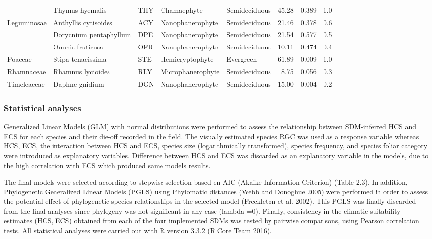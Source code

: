 \documentclass[11pt,twoside]{reedthesis}
\begin{document}
\begin{landscape}
\begin{table}[H]
\begin{tabular}[t]{lllllrrr}
 & Thymus hyemalis & THY & Chamaephyte & Semideciduous & 45.28 & 0.389 & 1.0\\
Leguminosae & Anthyllis cytisoides & ACY & Nanophanerophyte & Semideciduous & 21.46 & 0.378 & 0.6\\
 & Dorycnium pentaphyllum & DPE & Nanophanerophyte & Semideciduous & 21.54 & 0.577 & 0.5\\
 & Ononis fruticosa & OFR & Nanophanerophyte & Semideciduous & 10.11 & 0.474 & 0.4\\
Poaceae & Stipa tenacissima & STE & Hemicryptophyte & Evergreen & 61.89 & 0.009 & 1.0\\
Rhamnaceae & Rhamnus lycioides & RLY & Microphanerophyte & Semideciduous & 8.75 & 0.056 & 0.3\\
Timeleaceae & Daphne gnidium & DGN & Nanophanerophyte & Semideciduous & 15.00 & 0.004 & 0.2\\
\bottomrule
\end{tabular}
\end{table}
\end{landscape}
\subsubsection{Statistical analyses}\label{statistical-analyses}

Generalized Linear Models (GLM) with normal distributions were performed
to assess the relationship between SDM-inferred HCS and ECS for each
species and their die-off recorded in the field. The visually estimated
species RGC was used as a response variable whereas HCS, ECS, the
interaction between HCS and ECS, species size (logarithmically
transformed), species frequency, and species foliar category were
introduced as explanatory variables. Difference between HCS and ECS was
discarded as an explanatory variable in the models, due to the high
correlation with ECS which produced same models results.\par

The final models were selected according to stepwise selection based on
AIC (Akaike Information Criterion) (Table 2.3). In addition,
Phylogenetic Generalized Linear Models (PGLS) using Phylomatic distances
(Webb and Donoghue 2005) were performed in order to assess the potential
effect of phylogenetic species relationships in the selected model
(Freckleton et al. 2002). This PGLS was finally discarded from the final
analyses since phylogeny was not significant in any case (lambda =0).
Finally, consistency in the climatic suitability estimates (HCS, ECS)
obtained from each of the four implemented SDMs was tested by pairwise
comparisons, using Pearson correlation tests. All statistical analyses
were carried out with R version 3.3.2 (R Core Team 2016).\par
\end{document}
